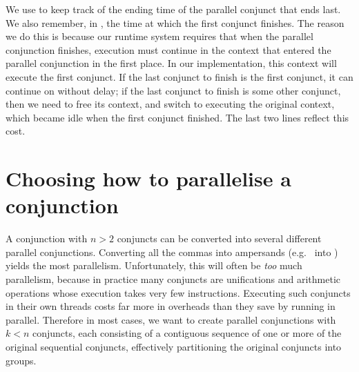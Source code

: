 {We use  to keep track of the ending time
of the parallel conjunct that ends last.
We also remember, in ,
the time at which the first conjunct finishes.
The reason we do this is because
our runtime system requires that
when the parallel conjunction finishes,
execution must continue in the context
that entered the parallel conjunction in the first place.
In our implementation, this context will execute the first conjunct.
If the last conjunct to finish is the first conjunct,
it can continue on without delay;
if the last conjunct to finish is some other conjunct,
then we need to free its context,
and switch to executing the original context,
which became idle when the first conjunct finished.
The last two lines reflect this cost.


}

\section{Choosing how to parallelise a conjunction}
\label{sec:overlap_howto}

A conjunction with $n > 2$ conjuncts
can be converted into several different parallel conjunctions.
Converting all the commas into ampersands
(e.g.\  into )
yields the most parallelism.
Unfortunately, this will often be \emph{too} much parallelism,
because in practice many conjuncts are unifications
and arithmetic operations whose execution takes very few instructions.
Executing such conjuncts in their own threads
costs far more in overheads than they save by running in parallel.
Therefore in most cases,
we want to create parallel conjunctions with $k < n$ conjuncts,
each consisting of a contiguous sequence
of one or more of the original sequential conjuncts,
effectively partitioning the original conjuncts into groups.

